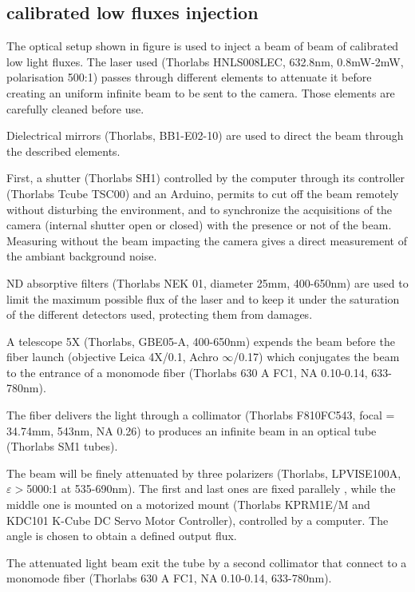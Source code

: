 \documentclass{article}
\begin{document}
\subsection{calibrated low fluxes injection}

The optical setup shown in figure  is used to inject a beam of beam of calibrated low light fluxes.
The laser used (Thorlabs HNLS008LEC, 632.8nm, 0.8mW-2mW, polarisation 500:1) passes through different elements to attenuate it before  creating an uniform infinite beam to be sent to the camera.
Those elements are carefully cleaned before use.

Dielectrical mirrors (Thorlabs, BB1-E02-10) are used  to direct the beam through the described elements.

First, a shutter (Thorlabs SH1) controlled by the computer through  its controller (Thorlabs Tcube TSC00) and an Arduino, permits to cut off the beam remotely without disturbing the environment,  and to synchronize the acquisitions of the camera (internal shutter open or closed) with the presence or not of the beam. Measuring without the beam impacting the camera gives a direct measurement of the ambiant background noise.

ND absorptive filters (Thorlabs NEK 01, diameter 25mm, 400-650nm) are used to limit the maximum possible flux of the laser and to keep it under the saturation of the different detectors used, protecting them from damages.

A telescope 5X (Thorlabs, GBE05-A, 400-650nm) expends the beam before the fiber launch (objective Leica 4X/0.1, Achro $\infty$/0.17) which conjugates the beam to the entrance of a monomode fiber (Thorlabs 630 A FC1, NA 0.10-0.14, 633-780nm).

The fiber delivers the light through a collimator (Thorlabs F810FC543, focal = 34.74mm, 543nm, NA 0.26) to produces an infinite beam in an optical tube (Thorlabs SM1 tubes).

The beam will be finely attenuated by three  polarizers (Thorlabs, LPVISE100A, $\varepsilon >$5000:1 at 535-690nm). 
The first and last ones are fixed parallely , while the middle one is mounted on a motorized mount (Thorlabs KPRM1E/M and KDC101 K-Cube DC Servo Motor Controller), controlled by a computer.
The angle is chosen to obtain a defined output flux.

The attenuated light beam exit the tube by a second collimator that connect to a monomode fiber (Thorlabs 630 A FC1, NA 0.10-0.14, 633-780nm).
\end{document}
